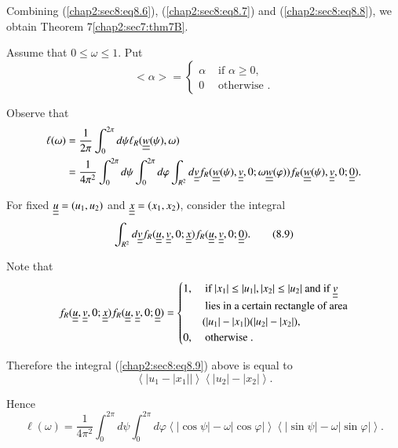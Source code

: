 Combining (\ref{chap2:sec8:eq8.6}), (\ref{chap2:sec8:eq8.7}) and (\ref{chap2:sec8:eq8.8}), we obtain Theorem 7\ref{chap2:sec7:thm7B}.

 Assume that $0 \leq \omega \leq 1$. Put
\begin{equation*}
 <\alpha> = 
\begin{cases}
 \alpha & \text{ if } \alpha \geq 0,\\
 0 & \text{ otherwise }.
\end{cases}
\end{equation*}

Observe that
{\fontsize{10}{12}\selectfont
\begin{align*}
\ell(\omega) & = \frac{1}{2\pi} \int_{0}^{2\pi} d\psi \ell_{R} (\underline{\underline{w}}(\psi), \omega)\\
& = \frac{1}{4\pi^{2}} \int_{0}^{2\pi} d\psi \int_{0}^{2\pi} d\varphi
\int_{R^{2}} d\underline{\underline{v}} f_{R}(\underline{\underline{w}}(\psi), \underline{\underline{v}}, 0; \omega
\underline{\underline{w}}(\varphi)) f_{R} (\underline{\underline{w}}(\psi), \underline{\underline{v}}, 0; \underline{\underline{0}}). 
\end{align*}}\relax\pageoriginale

For fixed $\underline{\underline{u}} = (u_{1}, u_{2})$ and $\underline{\underline{x}} = (x_{1}, x_{2})$, consider the integral 
\begin{equation*}
\int_{R^{2}} d\underline{\underline{v}} f_{R} (\underline{\underline{u}}, \underline{\underline{v}}, 0; \underline{\underline{x}}) f_{R} (\underline{\underline{u}}, \underline{\underline{v}}, 0; \underline{\underline{0}}).\tag{8.9}\label{chap2:sec8:eq8.9}
\end{equation*}

Note that
\begin{equation*}
f_{R} (\underline{\underline{u}}, \underline{\underline{v}}, 0; \underline{\underline{x}}) f_{R} (\underline{\underline{u}}, \underline{\underline{v}}, 0; \underline{\underline{0}}) = 
\begin{cases}
1, & \text{ if } |x_{1}| \leq |u_{1}|, |x_{2}| \leq |u_{2}| \text{ and if } \underline{\underline{v}}\\
& \text{ lies in a certain rectangle of area}\\
& (|u_{1}| - |x_{1}|)(|u_{2}| - |x_{2}|),\\
0, & \text{ otherwise }.
\end{cases}
\end{equation*}

Therefore the integral (\ref{chap2:sec8:eq8.9}) above is equal to
$$
\left<|u_{1} - |x_{1}||\right> \left<|u_{2}| - |x_{2}|\right>.
$$

Hence
$$
\ell (\omega) = \frac{1}{4\pi^{2}} \int_{0}^{2\pi} d\psi \int_{0}^{2\pi} d\varphi \left<|\cos \psi| - \omega |\cos \varphi|\right> \left<|\sin \psi| - \omega |\sin \varphi|\right>.
$$

